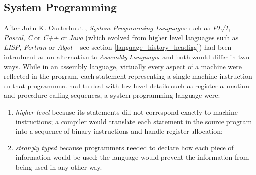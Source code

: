 %
%
%
%
%
%
%

\subsection{System Programming}
\label{system_programming_heading}

After John K. Ousterhout \cite{ousterhout1998}, \emph{System Programming Languages}
such as \emph{PL/1}, \emph{Pascal}, \emph{C} or \emph{C++} or \emph{Java}
(which evolved from higher level languages such as \emph{LISP}, \emph{Fortran} or
\emph{Algol} -- see section \ref{language_history_heading}) had been introduced
as an alternative to \emph{Assembly Languages} and both would differ in two
ways. While in an assembly language, virtually every aspect of a machine were
reflected in the program, each statement representing a single machine
instruction so that programmers had to deal with low-level details such as
register allocation and procedure calling sequences, a system programming
language were:

\begin{enumerate}
    \item \emph{higher level} because its statements did not correspond exactly
        to machine instructions; a compiler would translate each statement in
        the source program into a sequence of binary instructions and handle
        register allocation;
    \item \emph{strongly typed} because programmers needed to declare how each
        piece of information would be used; the language would prevent the
        information from being used in any other way.
\end{enumerate}

